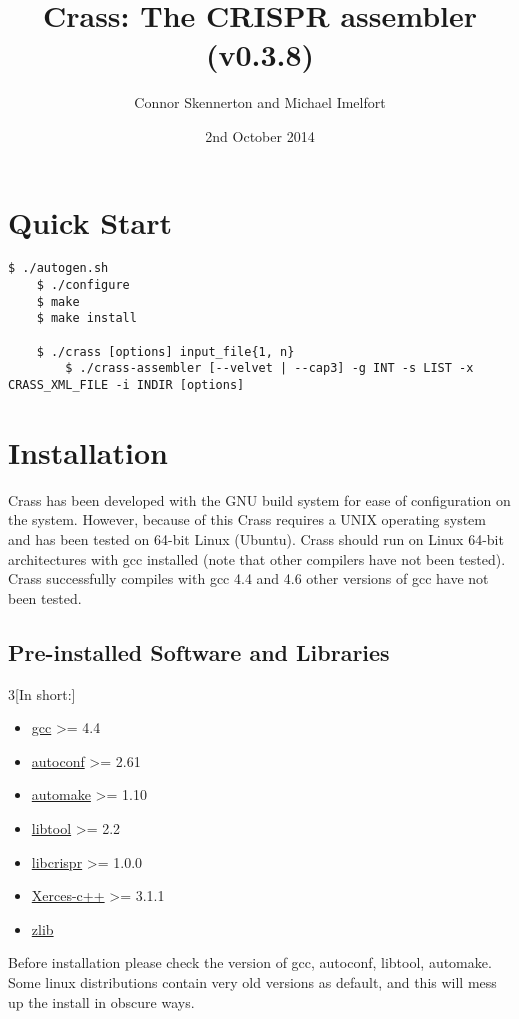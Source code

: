 \documentclass[11pt]{article} %
\title{Crass:  The CRISPR assembler (v0.3.8)}
\author{Connor Skennerton and Michael Imelfort}
\date{2nd October 2014} %
\newenvironment{warning}
  {\par\vspace{0.3cm}\begin{mdframed}[linewidth=2pt,linecolor=red]%
    \begin{list}{}{\leftmargin=1cm}
\sffamily\item[\color{red}\ding{43}]}
  {\end{list}\end{mdframed}\par\vspace{0.3cm}}
\begin{document}
\maketitle

\tableofcontents
\newpage
\section{Quick Start}
\begin{lstlisting}[style=BashInputStyle]
	$ ./autogen.sh
	$ ./configure
	$ make
	$ make install
	
	$ ./crass [options] input_file{1, n}
        $ ./crass-assembler [--velvet | --cap3] -g INT -s LIST -x CRASS_XML_FILE -i INDIR [options]
\end{lstlisting}
\section{Installation}
Crass has been developed with the GNU build system for ease of configuration on the system.  However, because of this Crass requires a UNIX operating system and has been tested on 64-bit Linux (Ubuntu).  Crass should run on Linux 64-bit architectures with gcc installed (note that other compilers have not been tested).  Crass successfully compiles with gcc 4.4 and 4.6 other versions of gcc have not been tested.    

\subsection{Pre-installed Software and Libraries}
\begin{multicols}{3}[In short:]
\begin{itemize}
\item \href{http://gcc.gnu.org/}{gcc} \textgreater= 4.4
\item \href{http://www.gnu.org/software/autoconf/}{autoconf}  \textgreater= 2.61
\item \href{http://www.gnu.org/software/automake/}{automake} \textgreater= 1.10
\item \href{http://www.gnu.org/software/libtool/}{libtool} \textgreater= 2.2
\item \href{http://ctskennerton.github.com/libcrispr}{libcrispr} \textgreater= 1.0.0
\item \href{http://xerces.apache.org/}{Xerces-c++} \textgreater= 3.1.1
\item \href{http://zlib.net/}{zlib}
\end{itemize}
\end{multicols}
\begin{warning}
 Before installation please check the version of gcc, autoconf, libtool, automake. Some linux distributions contain very old versions as default, and this will mess up the install in obscure ways. 
\end{warning}
\end{document}
